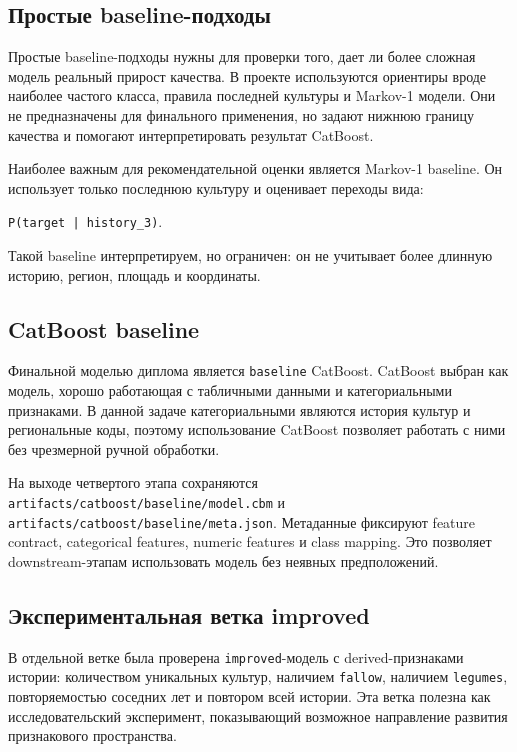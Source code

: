 \documentclass[a4paper,article,14pt]{extarticle}
\begin{document}
\subsection{Простые baseline-подходы}

Простые baseline-подходы нужны для проверки того, дает ли более сложная модель реальный прирост качества. В проекте используются ориентиры вроде наиболее частого класса, правила последней культуры и Markov-1 модели. Они не предназначены для финального применения, но задают нижнюю границу качества и помогают интерпретировать результат CatBoost.

Наиболее важным для рекомендательной оценки является Markov-1 baseline. Он использует только последнюю культуру и оценивает переходы вида:
\begin{center}
\texttt{P(target | history\_3)}.
\end{center}
Такой baseline интерпретируем, но ограничен: он не учитывает более длинную историю, регион, площадь и координаты.

\subsection{CatBoost baseline}

Финальной моделью диплома является \texttt{baseline} CatBoost. CatBoost выбран как модель, хорошо работающая с табличными данными и категориальными признаками. В данной задаче категориальными являются история культур и региональные коды, поэтому использование CatBoost позволяет работать с ними без чрезмерной ручной обработки.

На выходе четвертого этапа сохраняются \texttt{artifacts/catboost/baseline/model.cbm} и \texttt{artifacts/catboost/baseline/meta.json}. Метаданные фиксируют feature contract, categorical features, numeric features и class mapping. Это позволяет downstream-этапам использовать модель без неявных предположений.

\subsection{Экспериментальная ветка improved}

В отдельной ветке была проверена \texttt{improved}-модель с derived-признаками истории: количеством уникальных культур, наличием \texttt{fallow}, наличием \texttt{legumes}, повторяемостью соседних лет и повтором всей истории. Эта ветка полезна как исследовательский эксперимент, показывающий возможное направление развития признакового пространства.
\end{document}
